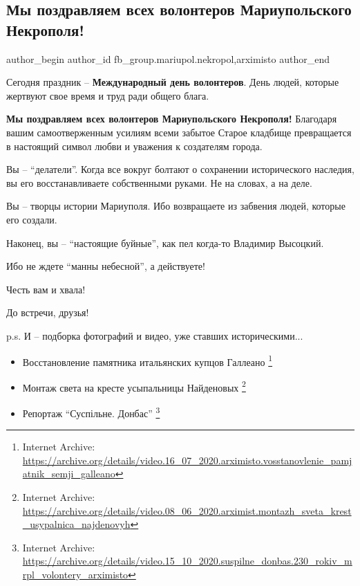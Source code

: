  
 
 
 
 

\subsection{Мы поздравляем всех волонтеров Мариупольского Некрополя!}
\label{sec:06_12_2020.fb.fb_group.mariupol.nekropol.1.mezhd_den_volontera_pozdravlenia}
 
\ifcmt
 author_begin
   author_id fb_group.mariupol.nekropol,arximisto
 author_end
\fi

Сегодня праздник – \textbf{Международный день волонтеров}. День людей, которые жертвуют
свое время и труд ради общего блага.

\textbf{Мы поздравляем всех волонтеров Мариупольского Некрополя!} Благодаря вашим
самоотверженным усилиям всеми забытое Старое кладбище превращается в настоящий
символ любви и уважения к создателям города.

Вы – \enquote{делатели}. Когда все вокруг болтают о сохранении исторического
наследия, вы его восстанавливаете собственными руками. Не на словах, а на деле.

Вы – творцы истории Мариуполя. Ибо возвращаете из забвения людей, которые его
создали.

Наконец, вы – \enquote{настоящие буйные}, как пел когда-то Владимир Высоцкий.

Ибо не ждете \enquote{манны небесной}, а действуете!

Честь вам и хвала!

До встречи, друзья!

p.s. И – подборка фотографий и видео, уже ставших историческими... 🙂

\begin{itemize} %
\item Восстановление памятника итальянских купцов Галлеано%
\footnote{Internet Archive: \url{https://archive.org/details/video.16_07_2020.arximisto.vosstanovlenie_pamjatnik_semji_galleano}}

\item Монтаж света на кресте усыпальницы Найденовых%
\footnote{Internet Archive: \url{https://archive.org/details/video.08_06_2020.arximist.montazh_sveta_krest_usypalnica_najdenovyh}}

\item Репортаж \enquote{Суспільне. Донбас}%
\footnote{Internet Archive: \url{https://archive.org/details/video.15_10_2020.suspilne_donbas.230_rokiv_mrpl_volontery_arximisto}}

\end{itemize} %
